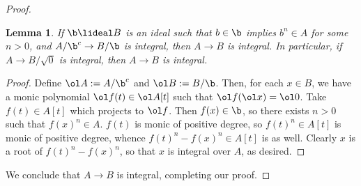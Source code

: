 \documentclass[12pt]{amsart}
\newtheorem{lemma}{Lemma}
\begin{document}
\begin{proof}
  \begin{lemma}
    If $\b\lideal B$ is an ideal such that $b\in \b$ implies $b^n\in A$ for some $n>0$, and $A/\b^c\to B/\b$ is integral, then $A\to B$ is integral.
    In particular, if $A\to B/\sqrt{0}$ is integral, then $A\to B$ is integral.
  \end{lemma}
  \begin{proof}
    Define $\ol A := A/\b^c$ and $\ol B:= B/\b$.
    Then, for each $x\in B$, we have a monic polynomial $\ol f(t)\in \ol A[t]$ such that $\ol f(\ol x) = \ol 0$.
    Take $f(t)\in A[t]$ which projects to $\ol f$.
    Then $f(x)\in \b$, so there exists $n>0$ such that $f(x)^n\in A$.
    $f(t)$ is monic of positive degree, so $f(t)^n\in A[t]$ is monic of positive degree, whence $f(t)^n-f(x)^n\in A[t]$ is as well.
    Clearly $x$ is a root of $f(t)^n-f(x)^n$, so that $x$ is integral over $A$, as desired.
  \end{proof}

  We conclude that $A\to B$ is integral, completing our proof.
\end{proof}
\end{document}
